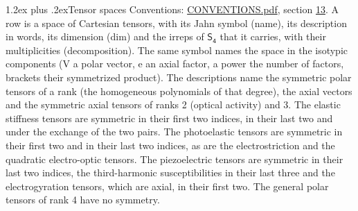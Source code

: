 \documentclass[10pt,a4paper]{article}
\makeatletter
\renewcommand\section{\@startsection{section}{1}{\z@}{-3ex plus -1ex minus -.2ex}%
  {1.2ex plus .2ex}{\normalfont\large\sffamily\bfseries\color{parttitle}}}
\numberwithin{equation}{section}
\newcommand{\grp}[1]{\mathsf{#1}}
\makeatother
\begin{document}
\section{Tensor spaces}\label{s:tensor_spaces}
Conventions: \href{../../CONVENTIONS.pdf}{CONVENTIONS.pdf}, section \href{../../CONVENTIONS.pdf\#conv.13}{13}.
\leavevmode\label{n:head.name}\label{n:head.description}\label{n:head.dim}\label{n:head.decomposition}A row is a space of Cartesian tensors, with its Jahn symbol (name), its description in words, its dimension (dim) and the irreps of $\grp{S_{4}}$ that it carries, with their multiplicities (decomposition). \label{n:label.jahn}The same symbol names the space in the isotypic components (V a polar vector, e an axial factor, a power the number of factors, brackets their symmetrized product). The descriptions name the symmetric polar tensors of a rank (the homogeneous polynomials of that degree), the axial vectors and the symmetric axial tensors of ranks 2 (optical activity) and 3. The elastic stiffness tensors are symmetric in their first two indices, in their last two and under the exchange of the two pairs. The photoelastic tensors are symmetric in their first two and in their last two indices, as are the electrostriction and the quadratic electro-optic tensors. The piezoelectric tensors are symmetric in their last two indices, the third-harmonic susceptibilities in their last three and the electrogyration tensors, which are axial, in their first two. The general polar tensors of rank 4 have no symmetry.
\end{document}
